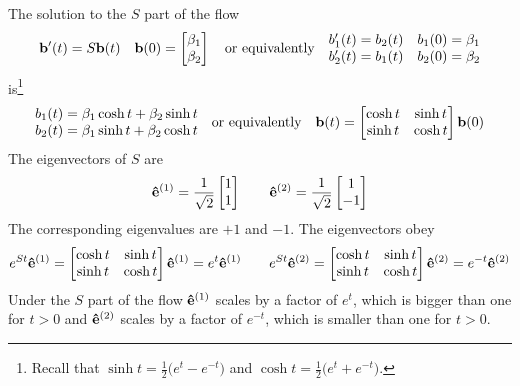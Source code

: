 \begin{eg}[$\ \vv(x,y)= 2y\hi.$]
The solution to  the $S$ part of the flow
\begin{equation*}
\mathbf{b}'(t)=S\mathbf{b}(t)\quad 
\mathbf{b}(0)=\left[\begin{matrix}\beta_1 \\ \beta_2\end{matrix}\right]
\quad\text{or equivalently}\quad
\begin{matrix}b_1'(t)=b_2(t) & b_1(0)=\beta_1\cr
        b_2'(t)=b_1(t) & b_2(0)=\beta_2\end{matrix}
\end{equation*}  
is\footnote{Recall that $\sinh t = \frac{1}{2}\big(e^t-e^{-t}\big)$
and $\cosh t = \frac{1}{2}\big(e^t+e^{-t}\big)$.}
\begin{equation*}
\begin{matrix}b_1(t)=\beta_1\cosh t+\beta_2\sinh t\cr
        b_2(t)=\beta_1\sinh t+\beta_2\cosh t\end{matrix}
\quad\text{or equivalently}\quad
\mathbf{b}(t)=\left[
  \begin{matrix}\cosh t& \sinh t\cr \sinh t&\cosh t\end{matrix}
  \right]\mathbf{b}(0)
\end{equation*}
The eigenvectors of $S$ are 
\begin{equation*}
\mathbf{\hat e}^{(1)}=\frac{1}{\sqrt{2}}\left[\begin{matrix}1\cr 1\end{matrix}\right]\qquad
\mathbf{\hat e}^{(2)}=\frac{1}{\sqrt{2}}\left[\begin{matrix}1\cr -1\end{matrix}\right]
\end{equation*}
The corresponding eigenvalues are $+1$ and $-1$. The eigenvectors obey
\begin{equation*}
e^{St}\mathbf{\hat e}^{(1)}=\left[\begin{matrix}\cosh t& \sinh t\cr \sinh t&\cosh t\end{matrix}\right]\mathbf{\hat e}^{(1)}
=e^t\mathbf{\hat e}^{(1)}\qquad
e^{St}\mathbf{\hat e}^{(2)}=\left[\begin{matrix}\cosh t& \sinh t\cr \sinh t&\cosh t\end{matrix}\right]\mathbf{\hat e}^{(2)}
=e^{-t}\mathbf{\hat e}^{(2)}
\end{equation*}
Under the $S$ part of the flow $\mathbf{\hat e}^{(1)}$ scales by a factor of $e^t$, which
is bigger than one for $t>0$ and $\mathbf{\hat e}^{(2)}$ scales by a factor of $e^{-t}$, which
is smaller than one for $t>0$.




\end{eg}
